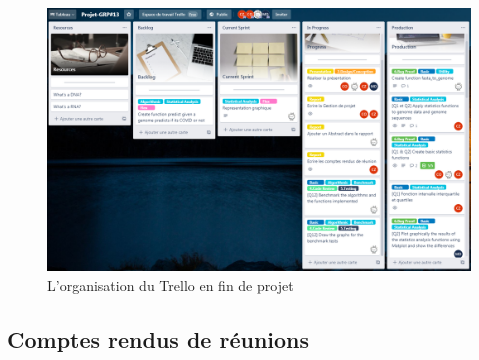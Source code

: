 \documentclass[12pt]{article}
\begin{document}
        \begin{figure}[!h]
            \centering
            \includegraphics[scale = 0.43]{Images/Gestion de Projet/Trello/trello_fin.PNG}
            \caption{L'organisation du Trello en fin de projet}
            \label{fig:Trellofin}
        \end{figure}

\newpage

\subsection*{Comptes rendus de réunions}
    
    \newpage
    
    \newpage
    
    \newpage
    
    \newpage
    
    \newpage
    
    \newpage
    
    \newpage
    
    \newpage
    
    \newpage
    
    \newpage
    
    \newpage
    

\newpage

\listoffigures
\listoftables

\newpage



\end{document}
